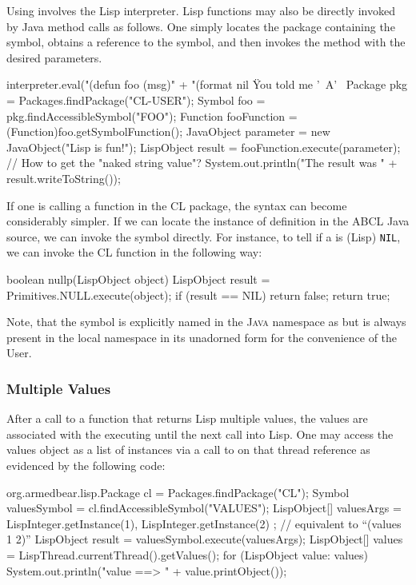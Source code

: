 \documentclass[10pt]{book}
\begin{document}
Using  involves the Lisp interpreter.  Lisp functions may
also be directly invoked by Java method calls as follows.  One simply
locates the package containing the symbol, obtains a reference to the
symbol, and then invokes the  method with the desired
parameters.

\begin{listing-java}
  interpreter.eval("(defun foo (msg)" +
    "(format nil \"You told me '~A'~%
  Package pkg = Packages.findPackage("CL-USER");
  Symbol foo = pkg.findAccessibleSymbol("FOO"); 
  Function fooFunction = (Function)foo.getSymbolFunction();
  JavaObject parameter = new JavaObject("Lisp is fun!");
  LispObject result = fooFunction.execute(parameter);
  // How to get the "naked string value"?
  System.out.println("The result was " + result.writeToString()); 
\end{listing-java}

If one is calling a function in the CL package, the syntax can become
considerably simpler.  If we can locate the instance of definition in
the ABCL Java source, we can invoke the symbol directly.  For instance,
to tell if a  is (Lisp) \texttt{NIL}, we can invoke the
CL function  in the following way:


\begin{listing-java}
  boolean nullp(LispObject object) {
    LispObject result = Primitives.NULL.execute(object);
    if (result == NIL) { 
      return false;
    }
    return true;
 }
\end{listing-java}

Note, that the symbol  is explicitly named in the
\textsc{Java} namespace as  but is always present in
the local namespace in its unadorned form for the convenience of the
User.

\subsubsection{Multiple Values}

After a call to a function that returns Lisp multiple values, the
values are associated with the executing  until the
next call into Lisp.  One may access the values object as a list of
 instances via a call to  on that
thread reference
as evidenced by the following code:

\begin{listing-java}

  org.armedbear.lisp.Package cl = Packages.findPackage("CL");
  Symbol valuesSymbol = cl.findAccessibleSymbol("VALUES");
  LispObject[] valuesArgs = {
    LispInteger.getInstance(1), LispInteger.getInstance(2)
  };
  // equivalent to ``(values 1 2)''
  LispObject result = valuesSymbol.execute(valuesArgs); 
  LispObject[] values = LispThread.currentThread().getValues();
  for (LispObject value: values) {
    System.out.println("value ==> " + value.printObject());
  }
\end{listing-java}
\end{document}
